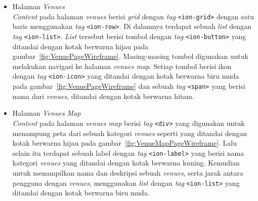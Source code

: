 \begin{enumerate}
\begin{itemize}
				\item Halaman \textit{Venues} \\
					\textit{Content} pada halaman \textit{venues} berisi \textit{grid} dengan \textit{tag} \texttt{<ion-grid>} dengan satu baris menggunakan \textit{tag} \texttt{<ion-row>}. Di dalamnya terdapat sebuah \textit{list} dengan \textit{tag} \texttt{<ion-list>}. \textit{List} tersebut berisi tombol dengan \textit{tag} \texttt{<ion-button>} yang ditandai dengan kotak berwarna hijau pada gambar~\ref{fig:VenuePageWireframe}. Masing-masing tombol digunakan untuk melakukan navigasi ke halaman \textit{venues map}. Setiap tombol berisi ikon dengan \textit{tag} \texttt{<ion-icon>} yang ditandai dengan kotak berwarna biru muda pada gambar~\ref{fig:VenuePageWireframe} dan sebuah \textit{tag} \texttt{<span>} yang berisi nama dari \textit{venues}, ditandai dengan kotak berwarna hitam.
					\newpage
				\item Halaman \textit{Venues Map} \\
					\textit{Content} pada halaman \textit{venues map} berisi \textit{tag} \texttt{<div>} yang digunakan untuk menampung peta dari sebuah kategori \textit{venues} seperti yang ditandai dengan kotak berwarna hijau pada gambar~\ref{fig:VenueMapPageWireframe}. Lalu selain itu terdapat sebuah label dengan \textit{tag} \texttt{<ion-label>} yang berisi nama kategori \textit{venues} yang ditandai dengan kotak berwarna kuning. Kemudian untuk menampilkan nama dan deskripsi sebuah \textit{venues}, serta jarak antara pengguna dengan \textit{venues}, menggunakan \textit{list} dengan \textit{tag} \texttt{<ion-list>} yang ditandai dengan kotak berwarna biru muda. 
				
			\end{itemize}			  
	\end{enumerate}